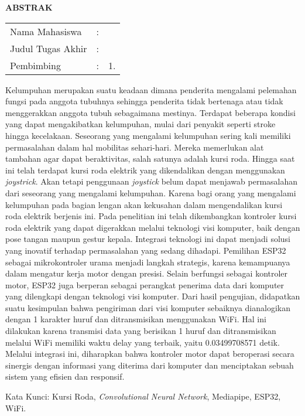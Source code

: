 \begin{center}
  \large\textbf{ABSTRAK}
\end{center}


\vspace{2ex}

\begingroup
\setlength{\tabcolsep}{0pt}

\noindent
\begin{tabularx}{\textwidth}{l >{\centering}m{2em} X}
  Nama Mahasiswa    & : & \name{}         \\

  Judul Tugas Akhir & : & \tatitle{}      \\

  Pembimbing        & : & 1. \advisor{}   \\
\end{tabularx}
\endgroup

Kelumpuhan merupakan suatu keadaan dimana penderita mengalami pelemahan fungsi pada anggota tubuhnya sehingga penderita tidak bertenaga atau tidak menggerakkan anggota tubuh sebagaimana mestinya. Terdapat beberapa kondisi yang dapat mengakibatkan kelumpuhan, mulai dari penyakit seperti stroke hingga kecelakaan. Seseorang yang mengalami kelumpuhan sering kali memiliki permasalahan dalam hal mobilitas sehari-hari. Mereka memerlukan alat tambahan agar dapat beraktivitas, salah satunya adalah kursi roda. Hingga saat ini telah terdapat kursi roda elektrik yang dikendalikan dengan menggunakan \emph{joystrick}. Akan tetapi penggunaan \emph{joystick} belum dapat menjawab permasalahan dari seseorang yang mengalami kelumpuhan. Karena bagi orang yang mengalami kelumpuhan pada bagian lengan akan kekusahan dalam mengendalikan kursi roda elektrik berjenis ini. Pada penelitian ini telah dikembangkan kontroler kursi roda elektrik yang dapat digerakkan melalui teknologi visi komputer, baik dengan pose tangan maupun gestur kepala. Integrasi teknologi ini dapat menjadi solusi yang inovatif terhadap permasalahan yang sedang dihadapi. Pemilihan ESP32 sebagai mikrokontroler urama menjadi langkah strategis, karena kemampuanya dalam mengatur kerja motor dengan presisi. Selain berfungsi sebagai kontroler motor, ESP32 juga berperan sebagai perangkat penerima data dari komputer yang dilengkapi dengan teknologi visi komputer. Dari hasil pengujian, didapatkan suatu kesimpulan bahwa pengiriman dari visi komputer sebaiknya dianalogikan dengan 1 karakter huruf dan ditransmisikan menggunakan WiFi. Hal ini dilakukan karena transmisi data yang berisikan 1 huruf dan ditransmisikan melalui WiFi memiliki waktu delay yang terbaik, yaitu 0.03499708571 detik. Melalui integrasi ini, diharapkan bahwa kontroler motor dapat beroperasi secara sinergis dengan informasi yang diterima dari komputer dan menciptakan sebuah sistem yang efisien dan responsif.

Kata Kunci: Kursi Roda, \emph{Convolutional Neural Network}, Mediapipe, ESP32, WiFi.
